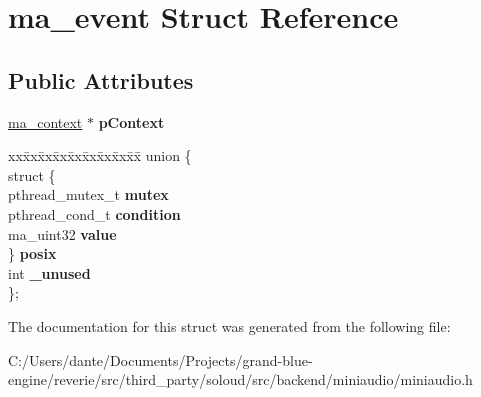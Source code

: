\hypertarget{structma__event}{}\section{ma\+\_\+event Struct Reference}
\label{structma__event}
\subsection*{Public Attributes}
\begin{DoxyCompactItemize}
\item 
\mbox{\label{structma__event_a7d7e575d92772f175f5e089e4134a3e8}} 
\mbox{\hyperlink{structma__context}{ma\+\_\+context}} $\ast$ {\bfseries p\+Context}
\item 
\mbox{\label{structma__event_a40b87e464b456fc3d3b284bad89fed2f}} 
\begin{tabbing}
xx\=xx\=xx\=xx\=xx\=xx\=xx\=xx\=xx\=\kill
union \{\\
\>struct \{\\
\>\>pthread\_mutex\_t {\bfseries mutex}\\
\>\>pthread\_cond\_t {\bfseries condition}\\
\>\>ma\_uint32 {\bfseries value}\\
\>\} {\bfseries posix}\\
\>int {\bfseries \_unused}\\
\}; \\

\end{tabbing}\end{DoxyCompactItemize}


The documentation for this struct was generated from the following file\+:\begin{DoxyCompactItemize}
\item 
C\+:/\+Users/dante/\+Documents/\+Projects/grand-\/blue-\/engine/reverie/src/third\+\_\+party/soloud/src/backend/miniaudio/miniaudio.\+h\end{DoxyCompactItemize}
